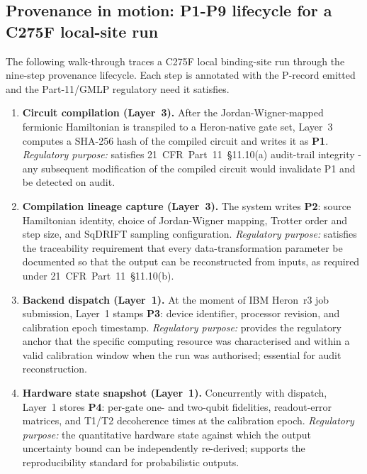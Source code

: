 \documentclass[11pt,letterpaper]{article}
\begin{document}
\subsection*{Provenance in motion: P1-P9 lifecycle for a C275F local-site run}
\label{sec:provenance-lifecycle}

The following walk-through traces a C275F local binding-site run through the nine-step
provenance lifecycle.  Each step is annotated with the P-record emitted and the
Part-11/GMLP regulatory need it satisfies.

\begin{enumerate}[leftmargin=2em,itemsep=4pt]

\item \textbf{Circuit compilation (Layer~3).}\;
After the Jordan-Wigner-mapped fermionic Hamiltonian is transpiled to a Heron-native
gate set, Layer~3 computes a SHA-256 hash of the compiled circuit and writes it as \textbf{P1}.
\textit{Regulatory purpose:} satisfies 21~CFR~Part~11~\S{}11.10(a) audit-trail integrity - any
subsequent modification of the compiled circuit would invalidate P1 and be detected on audit.

\item \textbf{Compilation lineage capture (Layer~3).}\;
The system writes \textbf{P2}: source Hamiltonian identity, choice of Jordan-Wigner
mapping, Trotter order and step size, and SqDRIFT sampling configuration.
\textit{Regulatory purpose:} satisfies the traceability requirement that every
data-transformation parameter be documented so that the output can be reconstructed from
inputs, as required under 21~CFR~Part~11~\S{}11.10(b).

\item \textbf{Backend dispatch (Layer~1).}\;
At the moment of IBM Heron~r3 job submission, Layer~1 stamps \textbf{P3}: device
identifier, processor revision, and calibration epoch timestamp.
\textit{Regulatory purpose:} provides the regulatory anchor that the specific computing
resource was characterised and within a valid calibration window when the run was
authorised; essential for audit reconstruction.

\item \textbf{Hardware state snapshot (Layer~1).}\;
Concurrently with dispatch, Layer~1 stores \textbf{P4}: per-gate one- and two-qubit
fidelities, readout-error matrices, and T1/T2 decoherence times at the calibration epoch.
\textit{Regulatory purpose:} the quantitative hardware state against which the output
uncertainty bound can be independently re-derived; supports the reproducibility standard
for probabilistic outputs.


\end{enumerate}
\end{document}
